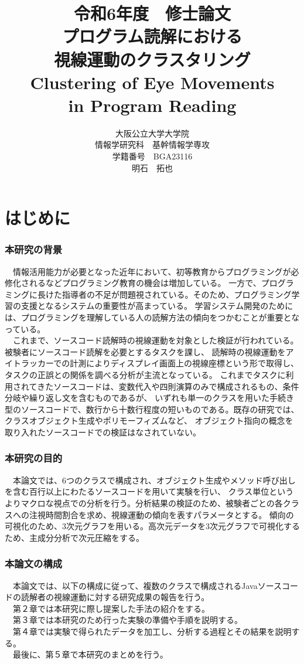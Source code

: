 \documentclass[paper=a4paper,fontsize=10pt]{jlreq}
\title{\huge 令和6年度　修士論文\\\vspace{100truept}プログラム読解における\\視線運動のクラスタリング\\
Clustering of Eye Movements\\ in Program Reading}
\author{\large 大阪公立大学大学院　\\情報学研究科　基幹情報学専攻\\学籍番号　BGA23116\\明石　拓也}
\begin{document}
\maketitle
\clearpage

\tableofcontents
\clearpage

\part{はじめに}
  \section{本研究の背景}
  　情報活用能力が必要となった近年において、初等教育からプログラミングが必修化されるなどプログラミング教育の機会は増加している。
  一方で、プログラミングに長けた指導者の不足が問題視されている。そのため、プログラミング学習の支援となるシステムの重要性が高まっている。
  学習システム開発のためには、プログラミングを理解している人の読解方法の傾向をつかむことが重要となっている。\\
  　これまで、ソースコード読解時の視線運動を対象とした検証が行われている。被験者にソースコード読解を必要とするタスクを課し、
  読解時の視線運動をアイトラッカーでの計測によりディスプレイ画面上の視線座標という形で取得し、タスクの正誤との関係を調べる分析が主流となっている。
  これまでタスクに利用されてきたソースコードは、変数代入や四則演算のみで構成されるもの、条件分岐や繰り返し文を含むものであるが、
  いずれも単一のクラスを用いた手続き型のソースコードで、数行から十数行程度の短いものである。既存の研究では、クラスオブジェクト生成やポリモーフィズムなど、
  オブジェクト指向の概念を取り入れたソースコードでの検証はなされていない。
  

  \section{本研究の目的}
  　本論文では、6つのクラスで構成され、オブジェクト生成やメソッド呼び出しを含む百行以上にわたるソースコードを用いて実験を行い、
  クラス単位というよりマクロな視点での分析を行う。分析結果の検証のため、被験者ごとの各クラスへの注視時間割合を求め、視線運動の傾向を表すパラメータとする。
  傾向の可視化のため、3次元グラフを用いる。高次元データを3次元グラフで可視化するため、主成分分析で次元圧縮をする。

  \section{本論文の構成}
  　本論文では、以下の構成に従って、複数のクラスで構成されるJavaソースコードの読解者の視線運動に対する研究成果の報告を行う。\\
  　第２章では本研究に際し提案した手法の紹介をする。\\
  　第３章では本研究のため行った実験の準備や手順を説明する。\\
  　第４章では実験で得られたデータを加工し、分析する過程とその結果を説明する。\\
  　最後に、第５章で本研究のまとめを行う。
\end{document}
